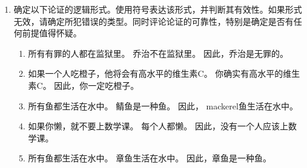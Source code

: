 \begin{enumerate}
  \item 
  
  确定以下论证的逻辑形式。使用符号表达该形式，并判断其有效性。如果形式无效，请确定所犯错误的类型。同时评论论证的可靠性，特别是确定是否有任何前提值得怀疑。
  \begin{enumerate}
  \item 
  所有有罪的人都在监狱里。\newline
  乔治不在监狱里。\newline
  因此，乔治是无罪的。
   
   \wbvfill
   
  
  \item 
  如果一个人吃橙子，他将会有高水平的维生素C。\newline
  你确实有高水平的维生素C。\newline
  因此，你一定吃橙子。
  \wbvfill
  
  \workbookpagebreak
  
  \item 
  所有鱼都生活在水中。\newline
  鲭鱼是一种鱼。\newline
  因此， mackerel鱼生活在水中。
    
    \wbvfill
  
  \item 
  如果你懒，就不要上数学课。\newline
  每个人都懒。\newline
  因此，没有一个人应该上数学课。
    
    \wbvfill
  
  \item 
  所有鱼都生活在水中。\newline
  章鱼生活在水中。\newline
  因此，章鱼是一种鱼。
  \wbvfill
  

\end{enumerate}
\end{enumerate}
